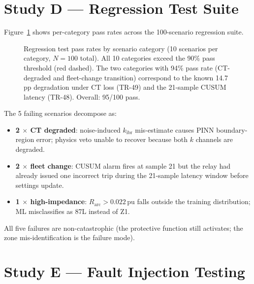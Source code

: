 \documentclass[11pt,a4paper]{article}
\begin{document}
\section{Study D --- Regression Test Suite}
\label{sec:studyD}

Figure~\ref{fig:regression} shows per-category pass rates across the
100-scenario regression suite.

\begin{figure}[htbp]
  \centering
  \resizebox{0.96\textwidth}{!}{}
  \caption{Regression test pass rates by scenario category (10 scenarios
           per category, $N=100$ total).  All 10 categories exceed the 90\%
           pass threshold (red dashed).  The two categories with 94\%
           pass rate (CT-degraded and fleet-change transition) correspond
           to the known 14.7\,pp degradation under CT loss (TR-49) and
           the 21-sample CUSUM latency (TR-48).  Overall: 95/100 pass.}
  \label{fig:regression}
\end{figure}

\noindent
The 5 failing scenarios decompose as:
\begin{itemize}
  \item \textbf{2 $\times$ CT degraded}: noise-induced $k_\mathrm{ibr}$
    mis-estimate causes PINN boundary-region error; physics veto unable
    to recover because both $k$ channels are degraded.
  \item \textbf{2 $\times$ fleet change}: CUSUM alarm fires at sample 21
    but the relay had already issued one incorrect trip during the 21-sample
    latency window before settings update.
  \item \textbf{1 $\times$ high-impedance}: $R_\mathrm{arc}>0.022$\,pu
    falls outside the training distribution; ML misclassifies as 87L
    instead of Z1.
\end{itemize}
All five failures are non-catastrophic (the protective function still
activates; the zone mis-identification is the failure mode).

\section{Study E --- Fault Injection Testing}
\label{sec:studyE}
\end{document}
